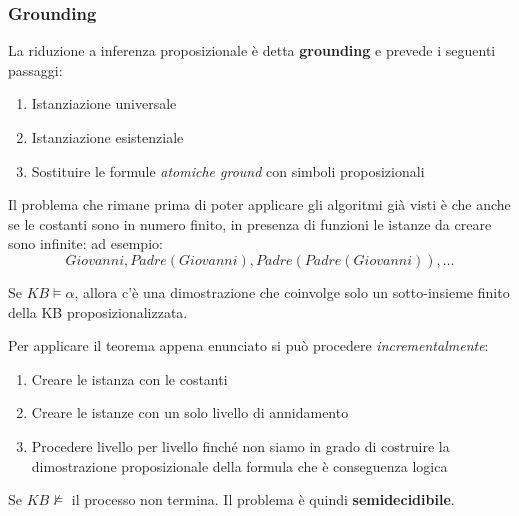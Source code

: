 \subsubsection{Grounding}
La riduzione a inferenza proposizionale è detta \textbf{grounding} e prevede i seguenti passaggi:
\begin{enumerate}
	\item Istanziazione universale
	\item Istanziazione esistenziale
	\item Sostituire le formule \textit{atomiche ground} con simboli proposizionali
\end{enumerate}
Il problema che rimane prima di poter applicare gli algoritmi già visti è che anche se le costanti sono in numero finito, in presenza di funzioni le istanze da creare sono infinite: ad esempio:
\begin{equation*}
	Giovanni, Padre(Giovanni), Padre(Padre(Giovanni)), \ldots
\end{equation*}

\begin{theorem}
	Se $KB \models \alpha$, allora c'è una dimostrazione che coinvolge solo un sotto-insieme finito della KB proposizionalizzata.
\end{theorem}
Per applicare il teorema appena enunciato si può procedere \textit{incrementalmente}:
\begin{enumerate}
	\item Creare le istanza con le costanti
	\item Creare le istanze con un solo livello di annidamento
	\item Procedere livello per livello finché non siamo in grado di costruire la dimostrazione proposizionale della formula che è conseguenza logica
\end{enumerate}
Se $KB\nvDash$ il processo non termina. Il problema è quindi \textbf{semidecidibile}.

